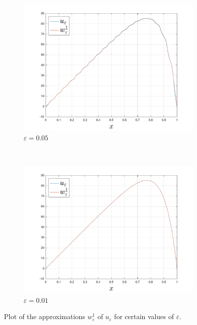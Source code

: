 \begin{example}
\begin{figure}[h!tb]
\begin{subfigure}[b]{0.5\textwidth}
        \includegraphics[width=\textwidth]{src/img/u_eps_w_1_eps_3.pdf}
        \caption{$\varepsilon = 0.05$}
    \end{subfigure}
    ~ %
    \begin{subfigure}[b]{0.5\textwidth}
        \includegraphics[width=\textwidth]{src/img/u_eps_w_1_eps_4.pdf}
        \caption{$\varepsilon = 0.01$}
    \end{subfigure}
    \caption{Plot of the approximations $w_\varepsilon^1$ of $u_\varepsilon$ for certain values of $\varepsilon$.}
    \label{fig:ex_2_plots}
	\end{figure}
	

\end{example}
